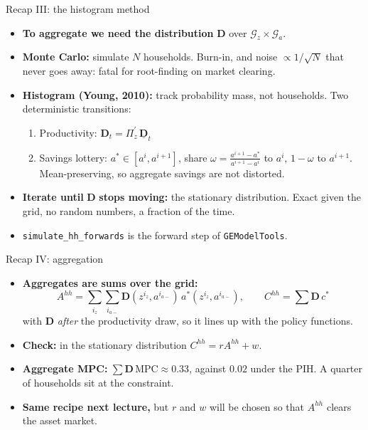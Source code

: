 \documentclass[
  10pt,
  ignorenonframetext,
  aspectratio=43,
  english,
]{beamer}
\providecommand{\tightlist}{%
  \setlength{\itemsep}{0pt}\setlength{\parskip}{0pt}}
\begin{document}
\begin{frame}[fragile]{Recap III: the histogram method}
\protect{}\label{recap-iii-the-histogram-method}
\begin{itemize}
\tightlist
\item
  \textbf{To aggregate we need the distribution} \(\boldsymbol{D}\) over \(\mathcal{G}_{z}\times\mathcal{G}_{a}\).
\item
  \textbf{Monte Carlo:} simulate \(N\) households. Burn-in, and noise \(\propto1/\sqrt{N}\) that never goes away: fatal for root-finding on market clearing.
\item
  \textbf{Histogram (Young, 2010):} track probability mass, not households. Two deterministic transitions:

  \begin{enumerate}
  \tightlist
  \item
    Productivity: \(\boldsymbol{D}_{t}=\Pi_{z}^{\prime}\,\underline{\boldsymbol{D}}_{t}\)
  \item
    Savings lottery: \(a^{\ast}\in[a^{i},a^{i+1}]\), share \(\omega=\frac{a^{i+1}-a^{\ast}}{a^{i+1}-a^{i}}\) to \(a^{i}\), \(1-\omega\) to \(a^{i+1}\). Mean-preserving, so aggregate savings are not distorted.
  \end{enumerate}
\item
  \textbf{Iterate until} \(\boldsymbol{D}\) \textbf{stops moving:} the stationary distribution. Exact given the grid, no random numbers, a fraction of the time.
\item
  \texttt{simulate\_hh\_forwards} is the forward step of \texttt{GEModelTools}.
\end{itemize}
\end{frame}

\begin{frame}{Recap IV: aggregation}
\protect{}\label{recap-iv-aggregation}
\begin{itemize}
\tightlist
\item
  \textbf{Aggregates are sums over the grid:}
  \[
  A^{hh}=\sum_{i_{z}}\sum_{i_{a-}}\boldsymbol{D}(z^{i_{z}},a^{i_{a-}})\,a^{\ast}(z^{i_{z}},a^{i_{a-}}),\qquad C^{hh}=\sum\boldsymbol{D}\,c^{\ast}
  \]
  with \(\boldsymbol{D}\) \emph{after} the productivity draw, so it lines up with the policy functions.
\item
  \textbf{Check:} in the stationary distribution \(C^{hh}=rA^{hh}+w\).
\item
  \textbf{Aggregate MPC:} \(\sum\boldsymbol{D}\,\text{MPC}\approx0.33\), against \(0.02\) under the PIH. A quarter of households sit at the constraint.
\item
  \textbf{Same recipe next lecture,} but \(r\) and \(w\) will be chosen so that \(A^{hh}\) clears the asset market.
\end{itemize}
\end{frame}
\end{document}

